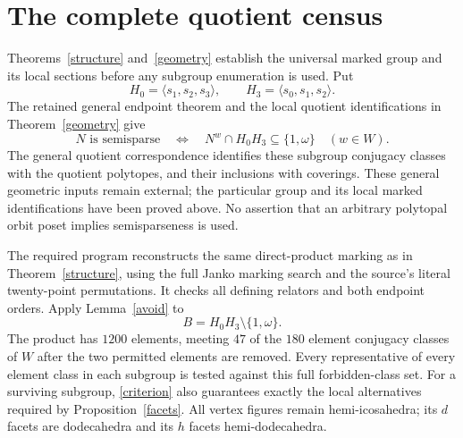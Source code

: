 \section{The complete quotient census}
Theorems~\ref{structure} and~\ref{geometry} establish the universal marked group and its local sections before any subgroup enumeration is used. Put
\[
 H_0=\langle s_1,s_2,s_3\rangle,\qquad H_3=\langle s_0,s_1,s_2\rangle.
\]
The retained general endpoint theorem and the local quotient identifications in Theorem~\ref{geometry} give
\begin{equation}\label{criterion}
 N\text{ is semisparse}\quad\Longleftrightarrow\quad
 N^w\cap H_0H_3\subseteq\{1,\omega\}\quad(w\in W).
\end{equation}
The general quotient correspondence identifies these subgroup conjugacy classes with the quotient polytopes, and their inclusions with coverings. These general geometric inputs remain external; the particular group and its local marked identifications have been proved above. No assertion that an arbitrary polytopal orbit poset implies semisparseness is used.

The required program reconstructs the same direct-product marking as in Theorem~\ref{structure}, using the full Janko marking search and the source's literal twenty-point permutations. It checks all defining relators and both endpoint orders. Apply Lemma~\ref{avoid} to
\[
 B=H_0H_3\setminus\{1,\omega\}.
\]
The product has $1200$ elements, meeting $47$ of the $180$ element conjugacy classes of $W$ after the two permitted elements are removed. Every representative of every element class in each subgroup is tested against this full forbidden-class set. For a surviving subgroup, \eqref{criterion} also guarantees exactly the local alternatives required by Proposition~\ref{facets}. All vertex figures remain hemi-icosahedra; its $d$ facets are dodecahedra and its $h$ facets hemi-dodecahedra.

